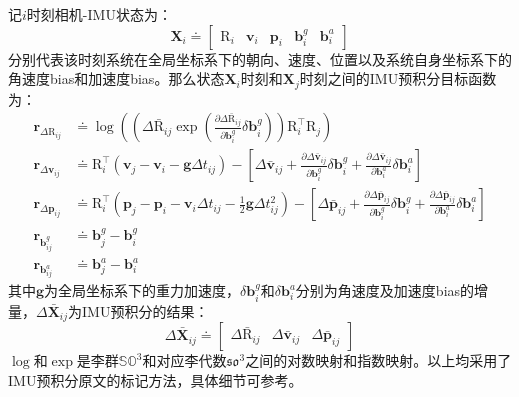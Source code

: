 记$i$时刻相机-IMU状态为：
\begin{equation}
\bm{X}_i \doteq
\begin{bmatrix}
    \mathrm{R}_i & \bm{v}_i & \bm{p}_i & \bm{b}^g_i & \bm{b}^a_i
\end{bmatrix}
\end{equation}
分别代表该时刻系统在全局坐标系下的朝向、速度、位置以及系统自身坐标系下的角速度bias和加速度bias。那么状态$\bm{X}_i$时刻和$\bm{X}_j$时刻之间的IMU预积分目标函数为：
\begin{equation}
\begin{aligned}
    \bm{r}_{\Delta\mathrm{R}_{ij}} &\doteq
    \log \left(
        \left(
            \Delta\bar{\mathrm R}_{ij}
            \exp \left(
                \tfrac{\partial\Delta\bar{\mathrm R}_{ij}}{\partial\bm{b}^g_i} \delta\bm{b}^g_i
            \right)
        \right)
        \mathrm{R}^\top_i \mathrm{R}_j
    \right) \\
    \bm{r}_{\Delta\bm{v}_{ij}} &\doteq
        \mathrm{R}^\top_i
        (\bm{v}_j - \bm{v}_i - \bm{g}\Delta t_{ij}) -
        \left[
            \Delta\bar{\bm v}_{ij} +
            \tfrac{\partial\Delta\bar{\bm v}_{ij}}{\partial\bm{b}^g_i}
            \delta\bm{b}^g_i +
            \tfrac{\partial\Delta\bar{\bm v}_{ij}}{\partial\bm{b}^a_i}
            \delta\bm{b}^a_i
        \right] \\
    \bm{r}_{\Delta\bm{p}_{ij}} &\doteq
        \mathrm{R}^\top_i
        (\bm{p}_j - \bm{p}_i - \bm{v}_i \Delta t_{ij} - \tfrac{1}{2}\bm{g}\Delta t^2_{ij}) -
        \left[
            \Delta\bar{\bm p}_{ij} +
            \tfrac{\partial\Delta\bar{\bm p}_{ij}}{\partial\bm{b}^g_i}
            \delta\bm{b}^g_i +
            \tfrac{\partial\Delta\bar{\bm p}_{ij}}{\partial\bm{b}^a_i}
            \delta\bm{b}^a_i
        \right] \\
    \bm{r}_{\bm{b}^g_{ij}} &\doteq \bm{b}^g_j - \bm{b}^g_i \\
    \bm{r}_{\bm{b}^a_{ij}} &\doteq \bm{b}^a_j - \bm{b}^a_i
\end{aligned}\label{eq:imu_error}
\end{equation}
其中$\bm{g}$为全局坐标系下的重力加速度，$\delta\bm{b}^g_i$和$\delta\bm{b}^a_i$分别为角速度及加速度bias的增量，$\Delta\bar{\bm{X}}_{ij}$为IMU预积分的结果：
\begin{equation}
\Delta\bar{\bm{X}}_{ij} \doteq
\begin{bmatrix}
    \Delta\bar{\mathrm{R}}_{ij} &
    \Delta\bar{\bm{v}}_{ij} &
    \Delta\bar{\bm{p}}_{ij}
\end{bmatrix}
\end{equation}
$\log$和$\exp$是李群$\mathbb{SO}^3$和对应李代数$\mathfrak{so}^3$之间的对数映射和指数映射。以上均采用了IMU预积分原文的标记方法，具体细节可参考。

